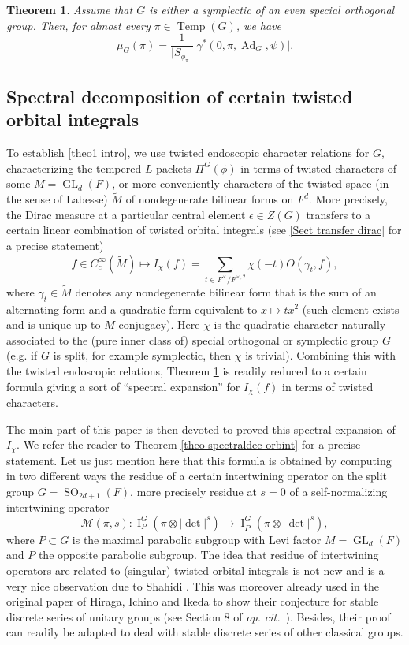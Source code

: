 \documentclass[12pt]{article}
\newtheorem{theo}{Theorem}[section]
\numberwithin{equation}{section}
\def\tM{\widetilde{M}}
\DeclareMathOperator{\Temp}{Temp}
\DeclareMathOperator{\Ad}{Ad}
\DeclareMathOperator{\GL}{\mathrm{GL}}
\DeclareMathOperator{\SO}{\mathrm{SO}}
\DeclareMathOperator{\rI}{\mathrm{I}}
\begin{document}
\begin{theo}\label{theo1 intro}
Assume that $G$ is either a symplectic of an even special orthogonal group. Then, for almost every $\pi\in \Temp(G)$, we have
\begin{equation*}
\displaystyle \mu_G(\pi)=\frac{1}{\lvert S_{\phi_\pi}\rvert}\lvert \gamma^*(0,\pi,\Ad_G,\psi)\rvert.
\end{equation*}
\end{theo}

\subsection{Spectral decomposition of certain twisted orbital integrals}

To establish \eqref{theo1 intro}, we use twisted endoscopic character relations for $G$, characterizing the tempered $L$-packets $\Pi^G(\phi)$ in terms of twisted characters of some $M=\GL_d(F)$, or more conveniently characters of the twisted space (in the sense of Labesse) $\tM$ of nondegenerate bilinear forms on $F^d$. More precisely, the Dirac measure at a particular central element $\epsilon\in Z(G)$ transfers to a certain linear combination of twisted orbital integrals (see \ref{Sect transfer dirac} for a precise statement)
$$\displaystyle f\in C_c^\infty(\widetilde{M})\mapsto I_{\chi}(f)=\sum_{t\in F^\times/F^{\times,2}} \chi(-t) O(\gamma_t,f),$$
where $\gamma_t\in \tM$ denotes any nondegenerate bilinear form that is the sum of an alternating form and a quadratic form equivalent to $x\mapsto tx^2$ (such element exists and is unique up to $M$-conjugacy). Here $\chi$ is the quadratic character naturally associated to the (pure inner class of) special orthogonal or symplectic group $G$ (e.g. if $G$ is split, for example symplectic, then $\chi$ is trivial). Combining this with the twisted endoscopic relations, Theorem \ref{theo1 intro} is readily reduced to a certain formula giving a sort of ``spectral expansion'' for $I_{\chi}(f)$ in terms of twisted characters.

The main part of this paper is then devoted to proved this spectral expansion of $I_{\chi}$. We refer the reader to Theorem \ref{theo spectraldec orbint} for a precise statement. Let us just mention here that this formula is obtained by computing in two different ways the residue of a certain intertwining operator on the split group $G=\SO_{2d+1}(F)$, more precisely residue at $s=0$ of a self-normalizing intertwining operator
$$\displaystyle \mathcal{M}(\pi,s): \rI^G_P(\pi\otimes \lvert \det\rvert^s)\to \rI^G_{\overline{P}}(\pi\otimes \lvert \det\rvert^s),$$
where $P\subset G$ is the maximal parabolic subgroup with Levi factor $M=\GL_d(F)$ and $\overline{P}$ the opposite parabolic subgroup. The idea that residue of intertwining operators are related to (singular) twisted orbital integrals is not new and is a very nice observation due to Shahidi \cite{Shaend}. This was moreover already used in the original paper of Hiraga, Ichino and Ikeda \cite{HII} to show their conjecture for stable discrete series of unitary groups (see Section 8 of {\it op. cit.}\ ). Besides, their proof can readily be adapted to deal with stable discrete series of other classical groups. 
\end{document}
